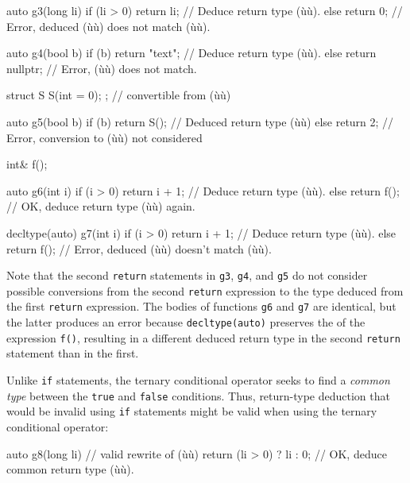 \begin{emcppslisting}[emcppsbatch=e2]
auto g3(long li)
{
    if (li > 0) { return li; }   // Deduce return type (ù{}ù).
    else        { return 0;  }   // Error, deduced (ù{}ù) does not match (ù{}ù).
}

auto g4(bool b)
{
    if (b) { return "text"; }   // Deduce return type (ù{}ù).
    else   { return nullptr; }  // Error, (ù{}ù) does not match.
}

struct S { S(int = 0); };  // convertible from (ù{}ù)

auto g5(bool b)
{
    if (b) { return S(); }  // Deduced return type (ù{}ù)
    else   { return 2; }    // Error, conversion to (ù{}ù) not considered
}

int& f();

auto g6(int i)
{
    if (i > 0) { return i + 1; }  // Deduce return type (ù{}ù).
    else       { return f(); }    // OK, deduce return type (ù{}ù) again.
}

decltype(auto) g7(int i)
{
    if (i > 0) { return i + 1; }  // Deduce return type (ù{}ù).
    else       { return f(); }    // Error, deduced (ù{}ù) doesn't match (ù{}ù).
}
\end{emcppslisting}
    

\noindent Note that the second \lstinline!return! statements in \lstinline!g3!,
\lstinline!g4!, and \lstinline!g5! do not consider possible conversions from
the second \lstinline!return! expression to the type deduced from the first
\lstinline!return! expression. The bodies of functions \lstinline!g6! and
\lstinline!g7! are identical, but the latter produces an error because
\lstinline!decltype(auto)! preserves the  of the
expression \lstinline!f()!, resulting in a different deduced return type in
the second \lstinline!return! statement than in the first.

Unlike \lstinline!if! statements, the ternary conditional operator seeks to
find a \emph{common type} between the \lstinline!true! and \lstinline!false!
conditions. Thus, return-type deduction that would be invalid using
\lstinline!if! statements might be valid when using the ternary conditional
operator:

\begin{emcppslisting}[emcppsbatch=e2]
auto g8(long li)  // valid rewrite of (ù{}ù)
{
    return (li > 0) ? li : 0;  // OK, deduce common return type (ù{}ù).
}
\end{emcppslisting}
    

